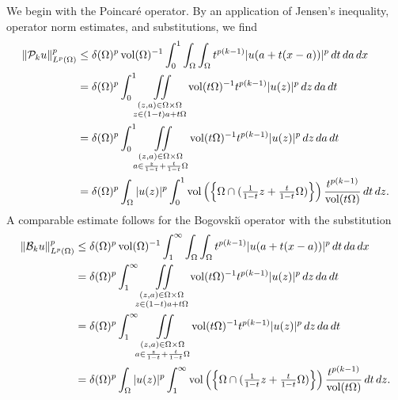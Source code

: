 \documentclass[10pt,a4paper]{article}
\begin{document}
We begin with the Poincar\'e operator. 
By an application of Jensen's inequality, operator norm estimates, and substitutions, we find 
\begin{align*}
    \| {\mathcal P}_{k} u \|_{L^{p}(\Omega)}^{p}
    &
    \leq 
    {\delta}(\Omega)^{p}
    \operatorname{vol}(\Omega)^{-1}
    \int_{0}^{1} \int_{\Omega} \int_{\Omega} 
    t^{p(k-1)} |u( a + t(x-a) )|^{p} \,dt \,da \,dx
    \\&
    = 
    {\delta}(\Omega)^{p}
    \int_{0}^{1} 
    \iint\limits_{\substack{ (z,a) \in \Omega \times \Omega \\ z \in (1-t) a + t \Omega } }
    \operatorname{vol}(t\Omega)^{-1}
    t^{p(k-1)} |u( z )|^{p} \,dz \,da \,dt
    \\&
    = 
    {\delta}(\Omega)^{p}
    \int_{0}^{1} 
    \iint\limits_{\substack{ (z,a) \in \Omega \times \Omega \\ a \in \frac{z}{1-t} + \frac{t}{1-t} \Omega } }
    \operatorname{vol}(t\Omega)^{-1}
    t^{p(k-1)} |u( z )|^{p} \,dz \,da \,dt
    \\&
    = 
    {\delta}(\Omega)^{p}
    \int_{\Omega} 
    |u( z )|^{p}
    \int_{0}^{1} 
    \operatorname{vol}\left(\left\{ 
        \Omega \cap ( \tfrac{1}{1-t} z + \tfrac{t}{1-t} \Omega )
    \right\}\right)
    \frac{ t^{p(k-1)} }{ \operatorname{vol}(t\Omega) }
    \,dt \,dz 
    .
\end{align*}
\color{red}
A comparable estimate follows for the Bogovski\u{\i} operator with the substitution 
\begin{align*}
    \| {\mathcal B}_{k} u \|_{L^{p}(\Omega)}^{p}
    &
    \leq 
    {\delta}(\Omega)^{p}
    \operatorname{vol}(\Omega)^{-1}
    \int_{1}^{\infty} \int_{\Omega} \int_{\Omega} 
    t^{p(k-1)} |u( a + t(x-a) )|^{p} \,dt \,da \,dx
    \\&
    = 
    {\delta}(\Omega)^{p}
    \int_{1}^{\infty} 
    \iint\limits_{\substack{ (z,a) \in \Omega \times \Omega \\ z \in (1-t) a + t \Omega } }
    \operatorname{vol}(t\Omega)^{-1}
    t^{p(k-1)} |u( z )|^{p} \,dz \,da \,dt
    \\&
    = 
    {\delta}(\Omega)^{p}
    \int_{1}^{\infty} 
    \iint\limits_{\substack{ (z,a) \in \Omega \times \Omega \\ a \in \frac{z}{1-t} + \frac{t}{1-t} \Omega } }
    \operatorname{vol}(t\Omega)^{-1}
    t^{p(k-1)} |u( z )|^{p} \,dz \,da \,dt
    \\&
    = 
    {\delta}(\Omega)^{p}
    \int_{\Omega} 
    |u( z )|^{p}
    \int_{1}^{\infty} 
    \operatorname{vol}\left(\left\{ 
        \Omega \cap ( \tfrac{1}{1-t} z + \tfrac{t}{1-t} \Omega )
    \right\}\right)
    \frac{ t^{p(k-1)} }{ \operatorname{vol}(t\Omega) }
    \,dt \,dz 
    .
\end{align*}
\end{document}
